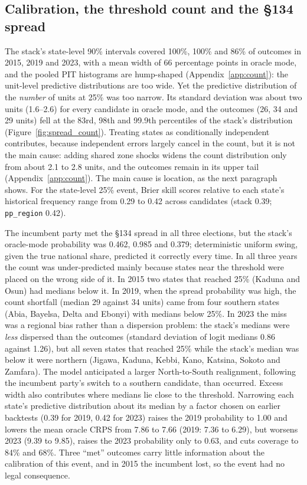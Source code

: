 \documentclass[preprint,12pt,authoryear]{elsarticle}
\begin{document}
\subsection{Calibration, the threshold count and the \S134 spread}
The stack's state-level 90\% intervals covered 100\%, 100\% and 86\% of outcomes in 2015, 2019 and 2023, with a mean width of 66 percentage points in oracle mode, and the pooled PIT histograms are hump-shaped (Appendix~\ref{app:count}): the unit-level predictive distributions are too wide. Yet the predictive distribution of the \emph{number} of units at 25\% was too narrow. Its standard deviation was about two units (1.6--2.6) for every candidate in oracle mode, and the outcomes (26, 34 and 29 units) fell at the 83rd, 98th and 99.9th percentiles of the stack's distribution (Figure~\ref{fig:spread_count}). Treating states as conditionally independent contributes, because independent errors largely cancel in the count, but it is not the main cause: adding shared zone shocks widens the count distribution only from about 2.1 to 2.8 units, and the outcomes remain in its upper tail (Appendix~\ref{app:count}). The main cause is location, as the next paragraph shows. For the state-level 25\% event, Brier skill scores relative to each state's historical frequency range from 0.29 to 0.42 across candidates (stack 0.39; \texttt{pp\_region} 0.42).

The incumbent party met the \S134 spread in all three elections, but the stack's oracle-mode probability was 0.462, 0.985 and 0.379; deterministic uniform swing, given the true national share, predicted it correctly every time. In all three years the count was under-predicted mainly because states near the threshold were placed on the wrong side of it. In 2015 two states that reached 25\% (Kaduna and Osun) had medians below it. In 2019, when the spread probability was high, the count shortfall (median 29 against 34 units) came from four southern states (Abia, Bayelsa, Delta and Ebonyi) with medians below 25\%. In 2023 the miss was a regional bias rather than a dispersion problem: the stack's medians were \emph{less} dispersed than the outcomes (standard deviation of logit medians 0.86 against 1.26), but all seven states that reached 25\% while the stack's median was below it were northern (Jigawa, Kaduna, Kebbi, Kano, Katsina, Sokoto and Zamfara). The model anticipated a larger North-to-South realignment, following the incumbent party's switch to a southern candidate, than occurred. Excess width also contributes where medians lie close to the threshold. Narrowing each state's predictive distribution about its median by a factor chosen on earlier backtests (0.39 for 2019, 0.42 for 2023) raises the 2019 probability to 1.00 and lowers the mean oracle CRPS from 7.86 to 7.66 (2019: 7.36 to 6.29), but worsens 2023 (9.39 to 9.85), raises the 2023 probability only to 0.63, and cuts coverage to 84\% and 68\%. Three ``met'' outcomes carry little information about the calibration of this event, and in 2015 the incumbent lost, so the event had no legal consequence.
\end{document}

